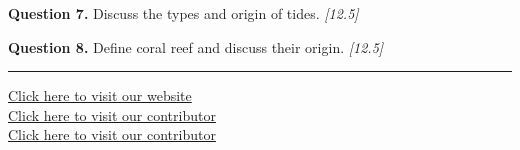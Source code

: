 \documentclass[11pt,a4paper]{article}
\newcommand{\pts}[1]{\hfill   \textit{[#1]}}
\begin{document}
\medskip


\noindent   \textbf{Question 7.} Discuss the types and origin of tides. \pts{12.5}

\medskip


\noindent   \textbf{Question 8.} Define coral reef and discuss their origin. \pts{12.5}

\vfill\rule{\linewidth}{0.4pt}

\begin{center}\small
\href{https://bhu-exam.vercel.app/}{Click here to visit our website}\\[4pt]
\href{https://me-aryan.vercel.app/}{Click here to visit our contributor}\\[4pt]
\href{https://quashan-me.vercel.app/}{Click here to visit our contributor}
\end{center}
\end{document}
